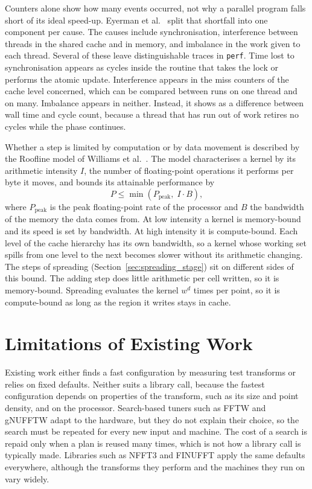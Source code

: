 Counters alone show how many events occurred, not why a parallel program falls short of its ideal speed-up. Eyerman et al.~\cite{eyerman2012} split that shortfall into one component per cause. The causes include synchronisation, interference between threads in the shared cache and in memory, and imbalance in the work given to each thread. Several of these leave distinguishable traces in \texttt{perf}. Time lost to synchronisation appears as cycles inside the routine that takes the lock or performs the atomic update. Interference appears in the miss counters of the cache level concerned, which can be compared between runs on one thread and on many. Imbalance appears in neither. Instead, it shows as a difference between wall time and cycle count, because a thread that has run out of work retires no cycles while the phase continues.

Whether a step is limited by computation or by data movement is described by the Roofline model of Williams et al.~\cite{williams2009roofline}. The model characterises a kernel by its arithmetic intensity $I$, the number of floating-point operations it performs per byte it moves, and bounds its attainable performance by
\begin{equation}
    P \le \min\left(P_{\text{peak}},\; I \cdot B\right),
    \label{eq:roofline}
\end{equation}
where $P_{\text{peak}}$ is the peak floating-point rate of the processor and $B$ the bandwidth of the memory the data comes from. At low intensity a kernel is memory-bound and its speed is set by bandwidth. At high intensity it is compute-bound. Each level of the cache hierarchy has its own bandwidth, so a kernel whose working set spills from one level to the next becomes slower without its arithmetic changing. The steps of spreading (Section~\ref{sec:spreading_stage}) sit on different sides of this bound. The adding step does little arithmetic per cell written, so it is memory-bound. Spreading evaluates the kernel $w^d$ times per point, so it is compute-bound as long as the region it writes stays in cache.

\section{Limitations of Existing Work}
\label{sec:related_gap}

Existing work either finds a fast configuration by measuring test transforms or relies on fixed defaults. Neither suits a library call, because the fastest configuration depends on properties of the transform, such as its size and point density, and on the processor. Search-based tuners such as FFTW and gNUFFTW adapt to the hardware, but they do not explain their choice, so the search must be repeated for every new input and machine. The cost of a search is repaid only when a plan is reused many times, which is not how a library call is typically made. Libraries such as NFFT3 and FINUFFT apply the same defaults everywhere, although the transforms they perform and the machines they run on vary widely.

